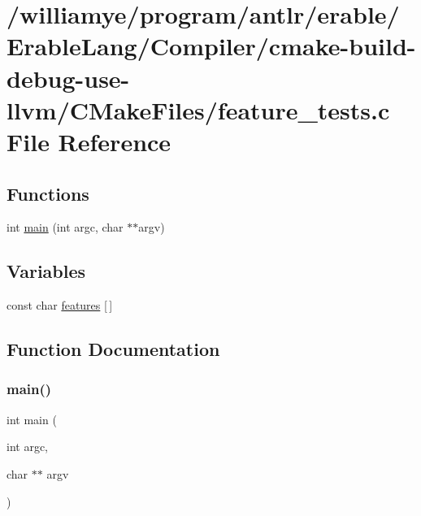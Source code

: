 \hypertarget{_compiler_2cmake-build-debug-use-llvm_2_c_make_files_2feature__tests_8c}{}\section{/williamye/program/antlr/erable/\+Erable\+Lang/\+Compiler/cmake-\/build-\/debug-\/use-\/llvm/\+C\+Make\+Files/feature\+\_\+tests.c File Reference}
\label{_compiler_2cmake-build-debug-use-llvm_2_c_make_files_2feature__tests_8c}
\subsection*{Functions}
\begin{DoxyCompactItemize}
\item 
int \mbox{\hyperlink{_compiler_2cmake-build-debug-use-llvm_2_c_make_files_2feature__tests_8c_a3c04138a5bfe5d72780bb7e82a18e627}{main}} (int argc, char $\ast$$\ast$argv)
\end{DoxyCompactItemize}
\subsection*{Variables}
\begin{DoxyCompactItemize}
\item 
const char \mbox{\hyperlink{_compiler_2cmake-build-debug-use-llvm_2_c_make_files_2feature__tests_8c_a1582568e32f689337602a16bf8a5bff0}{features}} \mbox{[}$\,$\mbox{]}
\end{DoxyCompactItemize}


\subsection{Function Documentation}
\mbox{\label{_compiler_2cmake-build-debug-use-llvm_2_c_make_files_2feature__tests_8c_a3c04138a5bfe5d72780bb7e82a18e627}} 
\subsubsection{\texorpdfstring{main()}{main()}}
{\footnotesize\ttfamily int main (\begin{DoxyParamCaption}\item[{int}]{argc,  }\item[{char $\ast$$\ast$}]{argv }\end{DoxyParamCaption})}



